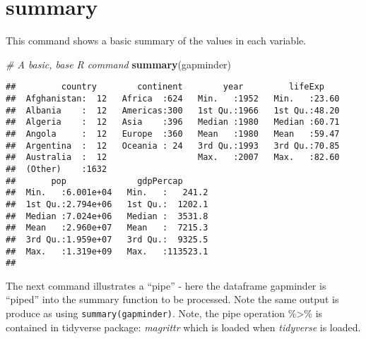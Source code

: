 \documentclass[]{book}
\newenvironment{Shaded}{\begin{snugshade}}{\end{snugshade}}
\newcommand{\KeywordTok}[1]{\textcolor[rgb]{0.13,0.29,0.53}{\textbf{#1}}}
\newcommand{\StringTok}[1]{\textcolor[rgb]{0.31,0.60,0.02}{#1}}
\newcommand{\CommentTok}[1]{\textcolor[rgb]{0.56,0.35,0.01}{\textit{#1}}}
\newcommand{\OperatorTok}[1]{\textcolor[rgb]{0.81,0.36,0.00}{\textbf{#1}}}
\newcommand{\NormalTok}[1]{#1}
\begin{document}
\section{summary}\label{summary}

This command shows a basic summary of the values in each variable.

\begin{Shaded}
\begin{Highlighting}[]
\CommentTok{# A basic, base R command}
\KeywordTok{summary}\NormalTok{(gapminder)}
\end{Highlighting}
\end{Shaded}

\begin{verbatim}
##         country        continent        year         lifeExp     
##  Afghanistan:  12   Africa  :624   Min.   :1952   Min.   :23.60  
##  Albania    :  12   Americas:300   1st Qu.:1966   1st Qu.:48.20  
##  Algeria    :  12   Asia    :396   Median :1980   Median :60.71  
##  Angola     :  12   Europe  :360   Mean   :1980   Mean   :59.47  
##  Argentina  :  12   Oceania : 24   3rd Qu.:1993   3rd Qu.:70.85  
##  Australia  :  12                  Max.   :2007   Max.   :82.60  
##  (Other)    :1632                                                
##       pop              gdpPercap       
##  Min.   :6.001e+04   Min.   :   241.2  
##  1st Qu.:2.794e+06   1st Qu.:  1202.1  
##  Median :7.024e+06   Median :  3531.8  
##  Mean   :2.960e+07   Mean   :  7215.3  
##  3rd Qu.:1.959e+07   3rd Qu.:  9325.5  
##  Max.   :1.319e+09   Max.   :113523.1  
## 
\end{verbatim}

The next command illustrates a ``pipe'' - here the dataframe gapminder
is ``piped'' into the summary function to be processed. Note the same
output is produce as using \texttt{summary(gapminder)}. Note, the pipe
operation \%\textgreater{}\% is contained in tidyverse package:
\emph{magrittr} which is loaded when \emph{tidyverse} is loaded.

\begin{Shaded}
\end{Shaded}
\end{document}
